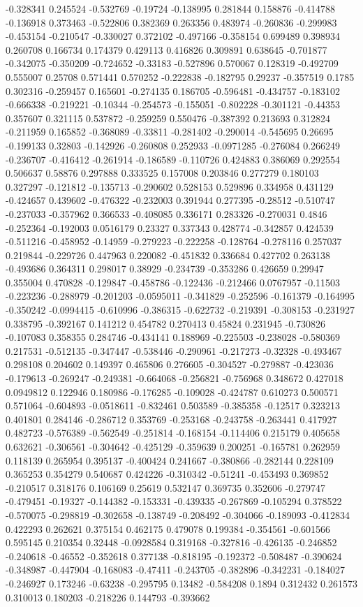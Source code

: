 -0.328341 0.245524 -0.532769 -0.19724 -0.138995 0.281844 0.158876 -0.414788 -0.136918 0.373463 -0.522806 0.382369 0.263356 0.483974 -0.260836 -0.299983 -0.453154 -0.210547 -0.330027 0.372102 -0.497166 -0.358154 0.699489 0.398934 0.260708 0.166734 0.174379 0.429113 0.416826 0.309891 0.638645 -0.701877 -0.342075 -0.350209 -0.724652 -0.33183 -0.527896 0.570067 0.128319 -0.492709 0.555007 0.25708 0.571441 0.570252 -0.222838 -0.182795 0.29237 -0.357519 0.1785 0.302316 -0.259457 0.165601 -0.274135 0.186705 -0.596481 -0.434757 -0.183102 -0.666338 -0.219221 -0.10344 -0.254573 -0.155051 -0.802228 -0.301121 -0.44353 0.357607 0.321115 0.537872 -0.259259 0.550476 -0.387392 0.213693 0.312824 -0.211959 0.165852 -0.368089 -0.33811 -0.281402 -0.290014 -0.545695 0.26695 -0.199133 0.32803 -0.142926 -0.260808 0.252933 -0.0971285 -0.276084 0.266249 -0.236707 -0.416412 -0.261914 -0.186589 -0.110726 0.424883 0.386069 0.292554 0.506637 0.58876 0.297888 0.333525 0.157008 0.203846 0.277279 0.180103 0.327297 -0.121812 -0.135713 -0.290602 0.528153 0.529896 0.334958 0.431129 -0.424657 0.439602 -0.476322 -0.232003 0.391944 0.277395 -0.28512 -0.510747 -0.237033 -0.357962 0.366533 -0.408085 0.336171 0.283326 -0.270031 0.4846 -0.252364 -0.192003 0.0516179 0.23327 0.337343 0.428774 -0.342857 0.424539 -0.511216 -0.458952 -0.14959 -0.279223 -0.222258 -0.128764 -0.278116 0.257037 0.219844 -0.229726 0.447963 0.220082 -0.451832 0.336684 0.427702 0.263138 -0.493686 0.364311 0.298017 0.38929 -0.234739 -0.353286 0.426659 0.29947 0.355004 0.470828 -0.129847 -0.458786 -0.122436 -0.212466 0.0767957 -0.11503 -0.223236 -0.288979 -0.201203 -0.0595011 -0.341829 -0.252596 -0.161379 -0.164995 -0.350242 -0.0994415 -0.610996 -0.386315 -0.622732 -0.219391 -0.308153 -0.231927 0.338795 -0.392167 0.141212 0.454782 0.270413 0.45824 0.231945 -0.730826 -0.107083 0.358355 0.284746 -0.434141 0.188969 -0.225503 -0.238028 -0.580369 0.217531 -0.512135 -0.347447 -0.538446 -0.290961 -0.217273 -0.32328 -0.493467 0.298108 0.204602 0.149397 0.465806 0.276605 -0.304527 -0.279887 -0.423036 -0.179613 -0.269247 -0.249381 -0.664068 -0.256821 -0.756968 0.348672 0.427018 0.0949812 0.122946 0.180986 -0.176285 -0.109028 -0.424787 0.610273 0.500571 0.571064 -0.604893 -0.0518611 -0.832461 0.503589 -0.385358 -0.12517 0.323213 0.401801 0.284146 -0.286712 0.353769 -0.253168 -0.243758 -0.263441 0.417927 0.482723 -0.576389 -0.562549 -0.251814 -0.168154 -0.114406 0.215179 0.405658 0.632621 -0.306561 -0.304642 -0.425129 -0.359639 0.200251 -0.165781 0.262959 0.118139 0.265954 0.395137 -0.400424 0.241667 -0.380866 -0.282144 0.228109 0.365253 0.354279 0.540687 0.424226 -0.310342 -0.51241 -0.453493 0.369852 -0.210517 0.318176 0.106169 0.25619 0.532147 0.369735 0.352606 -0.279747 -0.479451 -0.19327 -0.144382 -0.153331 -0.439335 -0.267869 -0.105294 0.378522 -0.570075 -0.298819 -0.302658 -0.138749 -0.208492 -0.304066 -0.189093 -0.412834 0.422293 0.262621 0.375154 0.462175 0.479078 0.199384 -0.354561 -0.601566 0.595145 0.210354 0.32448 -0.0928584 0.319168 -0.327816 -0.426135 -0.246852 -0.240618 -0.46552 -0.352618 0.377138 -0.818195 -0.192372 -0.508487 -0.390624 -0.348987 -0.447904 -0.168083 -0.47411 -0.243705 -0.382896 -0.342231 -0.184027 -0.246927 0.173246 -0.63238 -0.295795 0.13482 -0.584208 0.1894 0.312432 0.261573 0.310013 0.180203 -0.218226 0.144793 -0.393662 